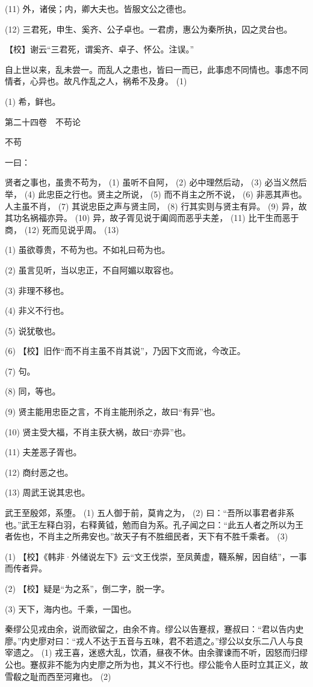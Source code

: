 \documentclass[12pt,UTF8]{ctexbook}
\begin{document}
(11) 外，诸侯；内，卿大夫也。皆服文公之德也。

(12) 三君死，申生、奚齐、公子卓也。一君虏，惠公为秦所执，囚之灵台也。

【校】谢云“三君死，谓奚齐、卓子、怀公。注误。”

自上世以来，乱未尝一。而乱人之患也，皆曰一而已，此事虑不同情也。事虑不同情者，心异也。故凡作乱之人，祸希不及身。 (1)

(1) 希，鲜也。





第二十四卷　不苟论



不苟


一曰：

贤者之事也，虽贵不苟为， (1) 虽听不自阿， (2) 必中理然后动， (3) 必当义然后举， (4) 此忠臣之行也。贤主之所说， (5) 而不肖主之所不说， (6) 非恶其声也。人主虽不肖， (7) 其说忠臣之声与贤主同， (8) 行其实则与贤主有异。 (9) 异，故其功名祸福亦异。 (10) 异，故子胥见说于阖闾而恶乎夫差， (11) 比干生而恶于商， (12) 死而见说乎周。 (13)

(1) 虽欲尊贵，不苟为也。不如礼曰苟为也。

(2) 虽言见听，当以忠正，不自阿媚以取容也。

(3) 非理不移也。

(4) 非义不行也。

(5) 说犹敬也。

(6) 【校】旧作“而不肖主虽不肖其说”，乃因下文而讹，今改正。

(7) 句。

(8) 同，等也。

(9) 贤主能用忠臣之言，不肖主能刑杀之，故曰“有异”也。

(10) 贤主受大福，不肖主获大祸，故曰“亦异”也。

(11) 夫差恶子胥也。

(12) 商纣恶之也。

(13) 周武王说其忠也。

武王至殷郊，系堕。 (1) 五人御于前，莫肯之为， (2) 曰：“吾所以事君者非系也。”武王左释白羽，右释黄钺，勉而自为系。孔子闻之曰：“此五人者之所以为王者佐也，不肖主之所弗安也。”故天子有不胜细民者，天下有不胜千乘者。 (3)

(1) 【校】《韩非·外储说左下》云“文王伐崇，至凤黄虚，韈系解，因自结”，一事而传者异。

(2) 【校】疑是“为之系”，倒二字，脱一字。

(3) 天下，海内也。千乘，一国也。

秦缪公见戎由余，说而欲留之，由余不肯。缪公以告蹇叔，蹇叔曰：“君以告内史廖。”内史廖对曰：“戎人不达于五音与五味，君不若遗之。”缪公以女乐二八人与良宰遗之。 (1) 戎王喜，迷惑大乱，饮酒，昼夜不休。由余骤谏而不听，因怒而归缪公也。蹇叔非不能为内史廖之所为也，其义不行也。缪公能令人臣时立其正义，故雪殽之耻而西至河雍也。 (2)
\end{document}
